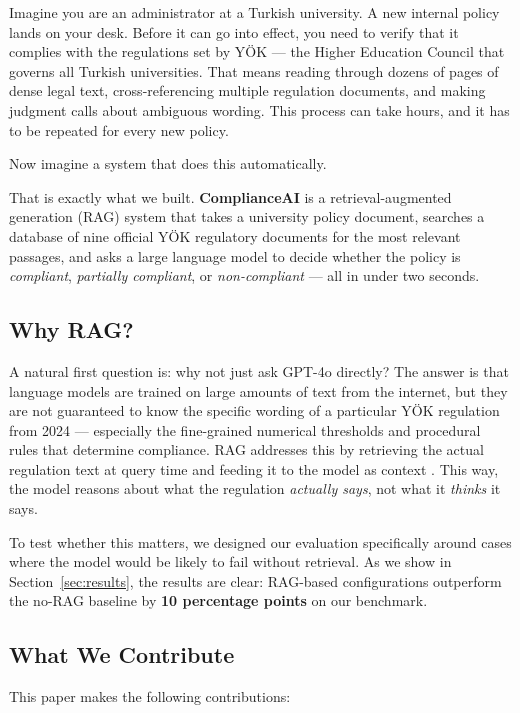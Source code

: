 Imagine you are an administrator at a Turkish university.
A new internal policy lands on your desk. Before it can go into effect,
you need to verify that it complies with the regulations set by YÖK ---
the Higher Education Council that governs all Turkish universities.
That means reading through dozens of pages of dense legal text,
cross-referencing multiple regulation documents, and making judgment calls
about ambiguous wording. This process can take hours, and it has to be
repeated for every new policy.

Now imagine a system that does this automatically.

That is exactly what we built. \textbf{ComplianceAI} is a
retrieval-augmented generation (RAG) system that takes a university policy
document, searches a database of nine official YÖK regulatory documents for
the most relevant passages, and asks a large language model to decide
whether the policy is \textit{compliant}, \textit{partially compliant}, or
\textit{non-compliant} --- all in under two seconds.

\subsection*{Why RAG?}

A natural first question is: why not just ask GPT-4o directly?
The answer is that language models are trained on large amounts of text from
the internet, but they are not guaranteed to know the specific wording of a
particular YÖK regulation from 2024 --- especially the fine-grained numerical
thresholds and procedural rules that determine compliance.
RAG addresses this by retrieving the actual regulation text at query time
and feeding it to the model as context \citep{Sun2025, Hillebrand2024}.
This way, the model reasons about what the regulation \textit{actually says},
not what it \textit{thinks} it says.

To test whether this matters, we designed our evaluation specifically around
cases where the model would be likely to fail without retrieval.
As we show in Section~\ref{sec:results}, the results are clear:
RAG-based configurations outperform the no-RAG baseline by \textbf{10 percentage
points} on our benchmark.

\subsection*{What We Contribute}

This paper makes the following contributions:

